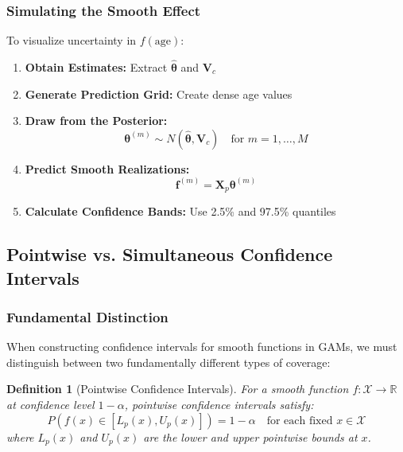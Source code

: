 \documentclass[12pt]{article}
\newtheorem{definition}{Definition}
\begin{document}
\subsubsection{Simulating the Smooth Effect}
To visualize uncertainty in $f(\text{age})$:

\begin{enumerate}
    \item \textbf{Obtain Estimates:} Extract $\hat{\boldsymbol{\theta}}$ and $\mathbf{V}_c$
    
    \item \textbf{Generate Prediction Grid:} Create dense age values
    
    \item \textbf{Draw from the Posterior:} 
    \begin{equation*}
        \boldsymbol{\theta}^{(m)} \sim N(\hat{\boldsymbol{\theta}}, \mathbf{V}_c) \quad \text{for } m = 1, \dots, M
    \end{equation*}
    
    \item \textbf{Predict Smooth Realizations:} 
    \begin{equation*}
        \mathbf{f}^{(m)} = \mathbf{X}_p \boldsymbol{\theta}^{(m)}
    \end{equation*}
    
    \item \textbf{Calculate Confidence Bands:} Use 2.5\% and 97.5\% quantiles
\end{enumerate}





\subsection{Pointwise vs. Simultaneous Confidence Intervals}

\subsubsection{Fundamental Distinction}

When constructing confidence intervals for smooth functions in GAMs, we must distinguish between two fundamentally different types of coverage:

\begin{definition}[Pointwise Confidence Intervals]
For a smooth function $f: \mathcal{X} \to \mathbb{R}$ at confidence level $1-\alpha$, pointwise confidence intervals satisfy:
\begin{equation}
P\left(f(x) \in [L_p(x), U_p(x)]\right) = 1-\alpha \quad \text{for each fixed } x \in \mathcal{X}
\end{equation}
where $L_p(x)$ and $U_p(x)$ are the lower and upper pointwise bounds at $x$.
\end{definition}
\end{document}
